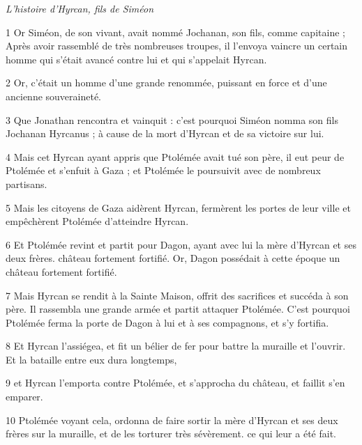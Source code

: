 \par [Ici se termine l'histoire telle qu'elle est donnée dans les deux livres habituellement attachés à nos Bibles.]


\par \textit{L'histoire d'Hyrcan, fils de Siméon}

\par 1 Or Siméon, de son vivant, avait nommé Jochanan, son fils, comme capitaine ; Après avoir rassemblé de très nombreuses troupes, il l'envoya vaincre un certain homme qui s'était avancé contre lui et qui s'appelait Hyrcan.

\par 2 Or, c'était un homme d'une grande renommée, puissant en force et d'une ancienne souveraineté.

\par 3 Que Jonathan rencontra et vainquit : c'est pourquoi Siméon nomma son fils Jochanan Hyrcanus ; à cause de la mort d'Hyrcan et de sa victoire sur lui.

\par 4 Mais cet Hyrcan ayant appris que Ptolémée avait tué son père, il eut peur de Ptolémée et s'enfuit à Gaza ; et Ptolémée le poursuivit avec de nombreux partisans.

\par 5 Mais les citoyens de Gaza aidèrent Hyrcan, fermèrent les portes de leur ville et empêchèrent Ptolémée d'atteindre Hyrcan.

\par 6 Et Ptolémée revint et partit pour Dagon, ayant avec lui la mère d'Hyrcan et ses deux frères. château fortement fortifié. Or, Dagon possédait à cette époque un château fortement fortifié.

\par 7 Mais Hyrcan se rendit à la Sainte Maison, offrit des sacrifices et succéda à son père. Il rassembla une grande armée et partit attaquer Ptolémée. C'est pourquoi Ptolémée ferma la porte de Dagon à lui et à ses compagnons, et s'y fortifia.

\par 8 Et Hyrcan l'assiégea, et fit un bélier de fer pour battre la muraille et l'ouvrir. Et la bataille entre eux dura longtemps,

\par 9 et Hyrcan l'emporta contre Ptolémée, et s'approcha du château, et faillit s'en emparer.

\par 10 Ptolémée voyant cela, ordonna de faire sortir la mère d'Hyrcan et ses deux frères sur la muraille, et de les torturer très sévèrement. ce qui leur a été fait.

